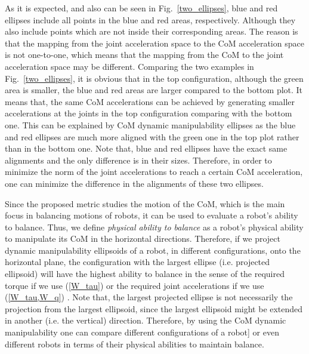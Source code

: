 As it is expected, and also can be seen in Fig.~\ref{two_ellipses}, blue and
red ellipses include all points in the blue and red areas, respectively.
Although they also include points which are not inside their corresponding
areas.  The reason is that the mapping from the joint acceleration space to
the CoM acceleration space is not one-to-one, which means that the mapping
from the CoM to the joint acceleration space may be different.  Comparing the
two examples in Fig.~\ref{two_ellipses}, it is obvious that in the top
configuration, although the green area is smaller, the blue and red areas are
larger compared to the bottom plot.  It means that, the same CoM accelerations
can be achieved by generating smaller accelerations at the joints in the top
configuration comparing with the bottom one.  This can be explained by CoM
dynamic manipulability ellipses as the blue and red ellipses are much more
aligned with the green one in the top plot rather than in the bottom one.
Note that, blue and red ellipses have the exact same alignments and the only
difference is in their sizes.  Therefore, in order to minimize the norm of the
joint accelerations to reach a certain CoM acceleration, one can minimize the
difference in the alignments of these two ellipses.

Since the proposed metric studies the motion of the CoM, which is the main
focus in balancing motions of robots, it can be used to evaluate a robot's
ability to balance.  Thus, we define \textit{physical ability to balance} as a
robot's physical ability to manipulate its CoM in the horizontal directions.
Therefore, if we project dynamic manipulability ellipsoids of a robot, in
different configurations, onto the horizontal plane, the configuration with
the largest ellipse (i.e. projected ellipsoid) will have the highest ability
to balance in the sense of the required torque if we use (\ref{W_tau}) or the
required joint accelerations if we use (\ref{W_tau,W_q}) .  Note that, the
largest projected ellipse is not necessarily the projection from the largest
ellipsoid, since the largest ellipsoid might be extended in another (i.e. the
vertical) direction.  Therefore, by using the CoM dynamic manipulability one
can compare different configurations of a robot] or even different robots in
terms of their physical abilities to maintain balance.


